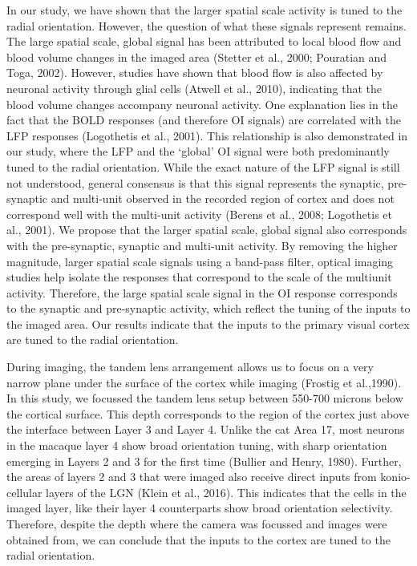 		
		In our study, we have shown that the larger spatial scale activity is tuned to the radial orientation. However, the question of what these signals represent remains. The large spatial scale, global signal has been attributed to local blood flow and blood volume changes in the imaged area (Stetter et al., 2000; Pouratian and Toga, 2002). However, studies have shown that blood flow is also affected by neuronal activity through glial cells (Atwell et al., 2010), indicating that the blood volume changes accompany neuronal activity. One explanation lies in the fact that the BOLD responses (and therefore OI signals) are correlated with the LFP responses (Logothetis et al., 2001). This relationship is also demonstrated in our study, where the LFP and the ‘global’ OI signal were both predominantly tuned to the radial orientation. While the exact nature of the LFP signal is still not understood, general consensus is that this signal represents the synaptic, pre-synaptic and multi-unit observed in the recorded region of cortex and does not correspond well with the multi-unit activity (Berens et al., 2008; Logothetis et al., 2001). We propose that the larger spatial scale, global signal also corresponds with the pre-synaptic, synaptic and multi-unit activity. By removing the higher magnitude, larger spatial scale signals using a band-pass filter, optical imaging studies help isolate the responses that correspond to the scale of the multiunit activity. Therefore, the large spatial scale signal in the OI response corresponds to the synaptic and pre-synaptic activity, which reflect the tuning of the inputs to the imaged area. Our results indicate that the inputs to the primary visual cortex are tuned to the radial orientation.
	
		During imaging, the tandem lens arrangement allows us to focus on a very narrow plane under the surface of the cortex while imaging (Frostig et al.,1990). In this study, we focussed the tandem lens setup between 550-700 microns below the cortical surface. This depth corresponds to the region of the cortex just above the interface between Layer 3 and Layer 4. Unlike the cat Area 17, most neurons in the macaque layer 4 show broad orientation tuning, with sharp orientation emerging in Layers 2 and 3 for the first time (Bullier and Henry, 1980). Further, the areas of layers 2 and 3 that were imaged also receive direct inputs from konio-cellular layers of the LGN (Klein et al., 2016). This indicates that the cells in the imaged layer, like their layer 4 counterparts show broad orientation selectivity. Therefore, despite the depth where the camera was focussed and images were obtained from, we can conclude that the inputs to the cortex are tuned to the radial orientation.
	
